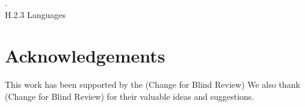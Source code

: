 \documentclass{ubicomp2010}
\begin{document}

.\\
{H.2.3}{ Languages}





%






\section{Acknowledgements}
This work has been supported by the (Change for Blind Review)%
We also thank (Change for Blind Review)%
for their valuable ideas and suggestions.




\end{document}
